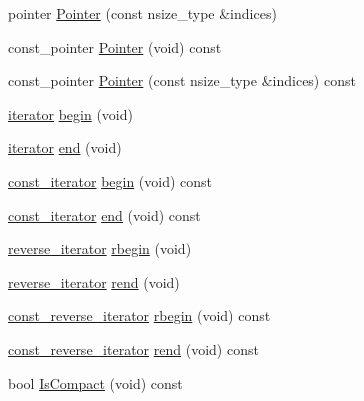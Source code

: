 \begin{DoxyCompactItemize}
\item 
pointer \hyperlink{classvct_dynamic_n_array_owner_a9f4590a546fb746b8c946389fab3743c}{Pointer} (const nsize\-\_\-type \&indices)
\item 
const\-\_\-pointer \hyperlink{classvct_dynamic_n_array_owner_a1599dc602921a75b03a6c9a74e2f0d9a}{Pointer} (void) const 
\item 
const\-\_\-pointer \hyperlink{classvct_dynamic_n_array_owner_a600f72fc3f92defc2ff04b536bbd21b0}{Pointer} (const nsize\-\_\-type \&indices) const 
\item 
\hyperlink{classvct_dynamic_n_array_owner_a48e740eae5c0a1654e5e93b12d388c19}{iterator} \hyperlink{classvct_dynamic_n_array_owner_a6e91f5e7d1f1b04fb69937aa4f1adbfd}{begin} (void)
\item 
\hyperlink{classvct_dynamic_n_array_owner_a48e740eae5c0a1654e5e93b12d388c19}{iterator} \hyperlink{classvct_dynamic_n_array_owner_a6cb3579addc28099853f114e8365501c}{end} (void)
\item 
\hyperlink{classvct_dynamic_n_array_owner_a81e092a15fe8a5bf0777a8b1f9cc8e4a}{const\-\_\-iterator} \hyperlink{classvct_dynamic_n_array_owner_a804091eb62274eba5399b03a8075a35b}{begin} (void) const 
\item 
\hyperlink{classvct_dynamic_n_array_owner_a81e092a15fe8a5bf0777a8b1f9cc8e4a}{const\-\_\-iterator} \hyperlink{classvct_dynamic_n_array_owner_af77223e152308f1508c2409fa81415e8}{end} (void) const 
\item 
\hyperlink{classvct_dynamic_n_array_owner_a9b4b9b8c6f7e3cfe9bdf9aedbdda6f0d}{reverse\-\_\-iterator} \hyperlink{classvct_dynamic_n_array_owner_a4a0ce4cbac1a4714f1aef1663d90b9b9}{rbegin} (void)
\item 
\hyperlink{classvct_dynamic_n_array_owner_a9b4b9b8c6f7e3cfe9bdf9aedbdda6f0d}{reverse\-\_\-iterator} \hyperlink{classvct_dynamic_n_array_owner_afcfe6ed0bff69625af0de37f1f34cfba}{rend} (void)
\item 
\hyperlink{classvct_dynamic_n_array_owner_a3c8cf0902cf51a404fc00cee4aac3f46}{const\-\_\-reverse\-\_\-iterator} \hyperlink{classvct_dynamic_n_array_owner_a75c23cdbbc41b86693b82bd45b894172}{rbegin} (void) const 
\item 
\hyperlink{classvct_dynamic_n_array_owner_a3c8cf0902cf51a404fc00cee4aac3f46}{const\-\_\-reverse\-\_\-iterator} \hyperlink{classvct_dynamic_n_array_owner_a985d7d011924469151dda6c9327a27ff}{rend} (void) const 
\item 
bool \hyperlink{classvct_dynamic_n_array_owner_a417fa6c312a72fd48c6a59b685b77aa5}{Is\-Compact} (void) const 

\end{DoxyCompactItemize}
